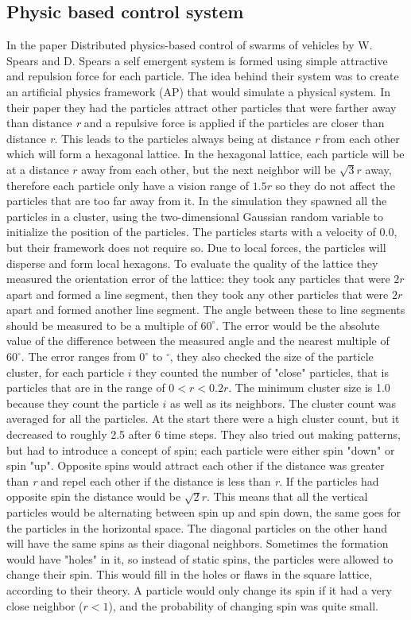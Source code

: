 \subsection{Physic based control system}
In the paper Distributed physics-based control of swarms of vehicles by W. Spears and D. Spears \cite{Spears2004} a self emergent system is formed using simple attractive and repulsion force for each particle. The idea behind their system was to create an artificial physics framework (AP) that would simulate a physical system. In their paper they had the particles attract other particles that were farther away than distance \textit{r} and a repulsive force is applied if the particles are closer than distance \textit{r}. This leads to the particles always being at distance \textit{r} from each other which will form a hexagonal lattice. In the hexagonal lattice, each particle will be at a distance $r$ away from each other, but the next neighbor will be $\sqrt{3}r$ away, therefore each particle only have a vision range of $1.5r$ so they do not affect the particles that are too far away from it. In the simulation they spawned all the particles in a cluster, using the two-dimensional Gaussian random variable to initialize the position of the particles. The particles starts with a velocity of 0.0, but their framework does not require so. Due to local forces, the particles will disperse and form local hexagons. To evaluate the quality of the lattice they measured the orientation error of the lattice: they took any particles that were $2r$ apart and formed a line segment, then they took any other particles that were $2r$ apart and formed another line segment. The angle between these to line segments should be measured to be a multiple of $60^{\circ}$. The error would be the absolute value of the difference between the measured angle and the nearest multiple of $60^{\circ}$. The error ranges from $0^{\circ}$ to $^{\circ}$, they also checked the size of the particle cluster, for each particle $i$ they counted the number of "close" particles, that is particles that are in the range of $0<r<0.2r$. The minimum cluster size is 1.0 because they count the particle $i$ as well as its neighbors. The cluster count was averaged for all the particles. At the start there were a high cluster count, but it decreased to roughly 2.5 after 6 time steps. 
They also tried out making patterns, but had to introduce a concept of spin; each particle were either spin "down" or spin "up". Opposite spins would attract each other if the distance was greater than \textit{r} and repel each other if the distance is less than \textit{r}. If the particles had opposite spin the distance would be $\sqrt{2}r$. This means that all the vertical particles would be alternating between spin up and spin down, the same goes for the particles in the horizontal space. The diagonal particles on the other hand will have the same spins as their diagonal neighbors. Sometimes the formation would have "holes" in it, so instead of static spins, the particles were allowed to change their spin. This would fill in the holes or flaws in the square lattice, according to their theory.
A particle would only change its spin if it had a very close neighbor ($r<1$), and the probability of changing spin was quite small.


